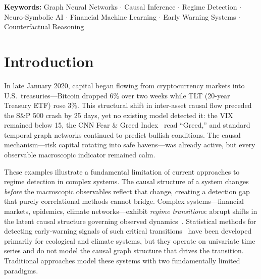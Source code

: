 \documentclass[11pt]{article}
\begin{document}
\textbf{Keywords:} Graph Neural Networks $\cdot$ Causal Inference $\cdot$ Regime Detection $\cdot$ Neuro-Symbolic AI $\cdot$ Financial Machine Learning $\cdot$ Early Warning Systems $\cdot$ Counterfactual Reasoning

\section{Introduction}

In late January 2020, capital began flowing from cryptocurrency markets into U.S.\ treasuries---Bitcoin dropped 6\% over two weeks while TLT (20-year Treasury ETF) rose 3\%. This structural shift in inter-asset causal flow preceded the S\&P 500 crash by 25 days, yet no existing model detected it: the VIX remained below 15, the CNN Fear \& Greed Index~\citep{cnn_fg} read ``Greed,'' and standard temporal graph networks continued to predict bullish conditions. The causal mechanism---risk capital rotating into safe havens---was already active, but every observable macroscopic indicator remained calm.

These examples illustrate a fundamental limitation of current approaches to regime detection in complex systems. The causal structure of a system changes \emph{before} the macroscopic observables reflect that change, creating a detection gap that purely correlational methods cannot bridge. Complex systems---financial markets, epidemics, climate networks---exhibit \emph{regime transitions}: abrupt shifts in the latent causal structure governing observed dynamics~\citep{scheffer2009early}. Statistical methods for detecting early-warning signals of such critical transitions~\citep{dakos2012methods} have been developed primarily for ecological and climate systems, but they operate on univariate time series and do not model the causal graph structure that drives the transition. Traditional approaches model these systems with two fundamentally limited paradigms.
\end{document}
